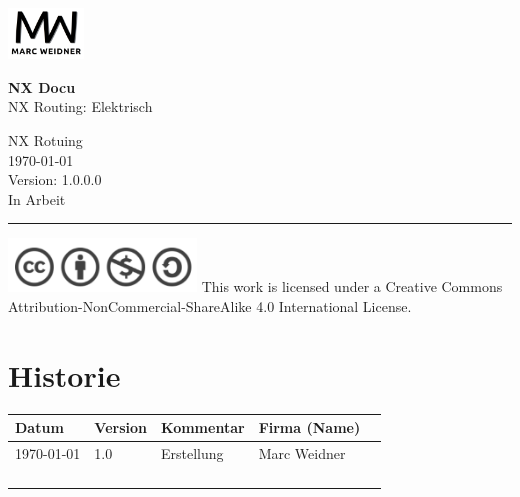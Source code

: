 \documentclass[ngerman, parskip=half*]{scrartcl}
\begin{document}

\begin{titlepage}
\begingroup
	\raggedright
		\includegraphics[width=2cm]{pics/logomwe}
		
\vspace{3cm}
{\huge \textbf{NX Docu}}\\
NX Routing: Elektrisch


\vspace{5cm}
	NX Rotuing\\
	{\today}\\	
	Version: 1.0.0.0\\
	In Arbeit\\
	\rule{0.2\linewidth}{1pt}%
	\par
\endgroup

\vspace{2cm}


\begin{eintrag}{
		\includegraphics[width=5cm,frame]{pics/cc}}	
	This work is licensed under a Creative Commons Attribution-NonCommercial-ShareAlike 4.0 International License.
\end{eintrag}

\end{titlepage}

	
\tableofcontents
	\pagebreak
\section{Historie}
\begin{tabularx}{1\textwidth}{@{}|l|X|X|X|X|@{}}
	\hline
	\rowcolor{lightgray}\textbf{}Datum & Version & Kommentar & Firma (Name) \\ \hline
	 \today & 1.0 & Erstellung & Marc Weidner \\ \hline
	 & & & \\ \hline
	 & & & \\ \hline
	 & & & \\ \hline
	 & & & \\ \hline
\end{tabularx}	
\end{document}
